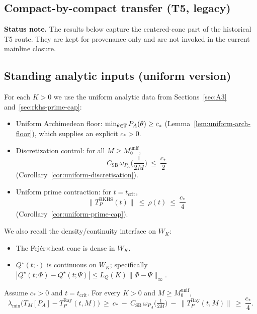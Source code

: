 \subsection{Compact-by-compact transfer (T5, legacy)}\label{sec:T5-compact}

\noindent\textbf{Status note.} The results below capture the centered-cone part of the historical T5 route. They are kept for provenance only and are not invoked in the current mainline closure.

\subsection*{Standing analytic inputs (uniform version)}
For each $K>0$ we use the uniform analytic data from Sections~\ref{sec:A3} and~\ref{sec:rkhs-prime-cap}:
\begin{itemize}
  \item[\textbf{(A3)}] Uniform Archimedean floor: $\min_{\theta\in\mathbb T} P_A(\theta) \ge c_*$
  (Lemma~\ref{lem:uniform-arch-floor}), which supplies an explicit $c_*>0$.
  \item[\textbf{(A3.b)}] Discretization control: for all $M\ge M_0^{\mathrm{unif}}$,
  \[
    C_{\mathrm{SB}}\,\omega_{P_A}\!\Big(\frac{1}{2M}\Big)\ \le\ \frac{c_*}{2}
  \]
  (Corollary~\ref{cor:uniform-discretisation}).
  \item[\textbf{(RKHS)}] Uniform prime contraction: for $t=t_{\mathrm{crit}}$,
  \[
    \|T_P^{\mathrm{RKHS}}(t)\|\ \le\ \rho(t)\ \le\ \frac{c_*}{4}
  \]
  (Corollary~\ref{cor:uniform-prime-cap}).
\end{itemize}

We also recall the density/continuity interface on $W_K$:
\begin{itemize}
  \item[\textbf{(A1$'$)}] The Fej\'er$\times$heat cone is dense in $W_K$.
  \item[\textbf{(A2)}] $Q^\star(t;\cdot)$ is continuous on $W_K$; specifically $|Q^\star(t;\Phi)-Q^\star(t;\Psi)|\le L_Q(K)\|\Phi-\Psi\|_\infty$.
\end{itemize}

\begin{lemma}\label{lem:T5p-grid}
Assume $c_*>0$ and $t=t_{\mathrm{crit}}$. For every $K>0$ and $M\ge M_0^{\mathrm{unif}}$,
\[
  \lambda_{\min}\!\big(T_M[P_A]-T_P^{\mathrm{Ray}}(t,M)\big)
  \ \ge\ c_*\ -\ C_{\mathrm{SB}}\,\omega_{P_A}\!\Big(\tfrac{1}{2M}\Big)\ -\ \|T_P^{\mathrm{Ray}}(t,M)\|
  \ \ge\ \frac{c_*}{4}.
\]
\end{lemma}

